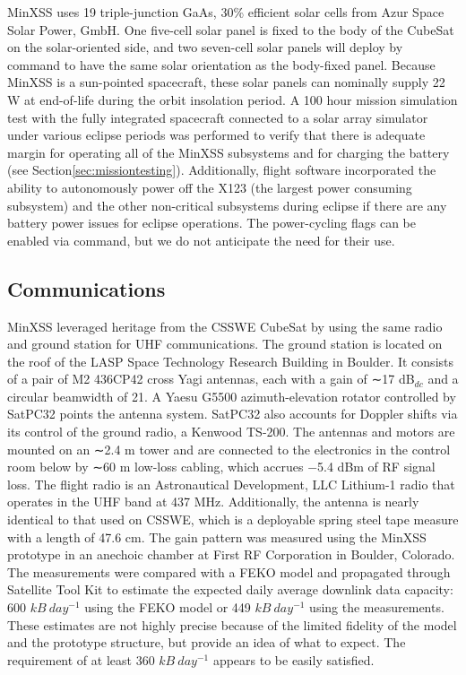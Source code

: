 MinXSS uses 19 triple-junction GaAs, 30\% efficient solar cells from Azur Space Solar Power, GmbH. One five-cell solar panel is fixed to the body of the CubeSat on the solar-oriented side, and two seven-cell solar panels will deploy by command to have the same solar orientation as the body-fixed panel. Because MinXSS is a sun-pointed spacecraft, these solar panels can nominally supply 22 W at end-of-life during the orbit insolation period. A 100 hour mission simulation test with the fully integrated spacecraft connected to a solar array simulator under various eclipse periods was performed to verify that there is adequate margin for operating all of the MinXSS subsystems and for charging the battery (see Section\ref{sec:missiontesting}). Additionally, flight software incorporated the ability to autonomously power off the X123 (the largest power consuming subsystem) and the other non-critical subsystems during eclipse if there are any battery power issues for eclipse operations. The power-cycling flags can be enabled via command, but we do not anticipate the need for their use.

\subsection{Communications}
MinXSS leveraged heritage from the CSSWE CubeSat by using the same radio and ground station for UHF communications. The ground station is located on the roof of the LASP Space Technology Research Building in Boulder. It consists of a pair of M2 436CP42 cross Yagi antennas, each with a gain of ∼17 dB$_{dc}$ and a circular beamwidth of 21\degree. A Yaesu G5500 azimuth-elevation rotator controlled by SatPC32 points the antenna system. SatPC32 also accounts for Doppler shifts via its control of the ground radio, a Kenwood TS-200. The antennas and motors are mounted on an ∼2.4 m tower and are connected to the electronics in the control room below by ∼60 m low-loss cabling, which accrues −5.4 dBm of RF signal loss. The flight radio is an Astronautical Development, LLC Lithium-1 radio that operates in the UHF band at 437 MHz. Additionally, the antenna is nearly identical to that used on CSSWE, which is a deployable spring steel tape measure with a length of 47.6 cm. The gain pattern was measured using the MinXSS prototype in an anechoic chamber at First RF Corporation in Boulder, Colorado. The measurements were compared with a FEKO model and propagated through Satellite Tool Kit to estimate the expected daily average downlink data capacity: 600 $kB\ day^{-1}$ using the FEKO model or 449 $kB\ day^{-1}$ using the measurements. These estimates are not highly precise because of the limited fidelity of the model and the prototype structure, but provide an idea of what to expect. The requirement of at least 360 $kB\ day^{-1}$ appears to be easily satisfied.

